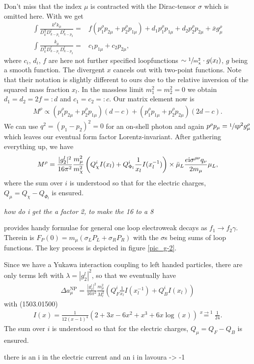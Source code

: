Don't miss that the index $\mu$ is contracted with the Dirac-tensor $\sigma$ which is omitted here. With \cite{Lavoura} we get
\begin{align}
 \int\frac{ k^\rho k_\mu}{D^\chi_kD^l_{k-p_1}D^l_{k-p_2}} =&  f (p_1^\rho p_{2\mu} + p_2^\rho p_{1\mu}) +  d_1p_1^\rho p_{1\mu} +  d_2p_2^\rho p_{2\mu} + \bar x g^\rho_\mu\\
 \int\frac{k_\mu}{D^\chi_kD^l_{k-p_1}D^l_{k-p_2}} =&  c_1 p_{1\mu} +  c_2 p_{2\mu},
\end{align}
where $c_i$, $d_i$, $f$ are here not further specified loopfunctions $\sim \sfrac{1}{m^2_\chi} \cdot g(x_l)$, $g$ being a smooth function. The divergent $x$
cancels out with two-point functions. Note that their notation is slightly different to ours due to the relative inversion of the squared mass 
fraction $x_l$. In the massless limit $m_1^2 = m_2^2 = 0$ we obtain $d_1 = d_2 = 2f =: d$ and $c_1 = c_2 =: c$. Our matrix element now is
\begin{align}
 M^\rho \propto (p_1^\rho p_{2\mu} + p_2^\rho p_{1\mu}) (d-c) + (p_1^\rho p_{1\mu} + p_2^\rho p_{2\mu}) (2d-c).
\end{align}
We can use $q^2 = (p_1-p_2)^2 = 0$ for an on-shell photon and again $p^\rho p_\mu = \sfrac{1}{4} p^2 g^\rho_\mu $ which leaves our eventual form factor 
Lorentz-invariant. After gathering everything up, we have
\begin{align}
 M^\rho = \frac{|g^l_2|^2}{16\pi^2} \frac{m^2_\mu}{m_\chi^2}\left(Q_\chi^i I(x_l) + Q_{\Phi_l}^i \frac{1}{x_l} I(x_l^{-1}) \right)\times \bar \mu_L\frac{e\text{i}\sigma^{\rho\nu}q_\nu}{2m_\mu} \mu_L,
\end{align}
where the sum over $i$ is understood so that for the electric charges, $Q_\mu = Q_\chi - Q_{\Phi_l}$ is ensured. 

\textit{how do i get the a factor 2, to make the 16 to a 8}

provides handy formulae for general one loop electroweak decays as $f_1 \rightarrow f_2 \gamma$. Therein
is $F_P(0) =m_\mu\left( \sigma_L P_L + \sigma_R P_R\right)$ with the $\sigma$s being sums of loop functions. The key process is depicted in figure \ref{pic_g-2}.

Since we have a Yukawa interaction coupling to left handed particles, there are only terms left with $\lambda=|g_2^l|^2$, so that we eventually have
\begin{align}
 \Delta a_\mu^\text{NP} = \frac{|{g_2^l}|^2}{16\pi^2}\frac{m_\mu^2}{M_l^2}\left(Q^i_F \frac{1}{x_l}I(x_l^{-1}) + Q^i_B  I(x_l)\right)
\end{align}
with (1503.01500)
\begin{align}
 I(x) = \frac{1}{12(x-1)^4}\left(2+3x-6x^2+x^3+6x\log(x) \right) \stackrel{x\rightarrow1}{=} \frac{1}{24}.
\end{align}
The sum over $i$ is understood so that for the electric charges, $Q_\mu = Q_F-Q_B$ is ensured.

there is an i in the electric current and an i in lavoura -> -1